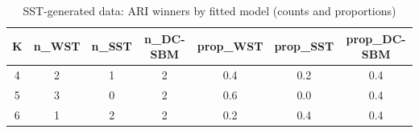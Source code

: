 \begin{table}[!h]
\centering
\caption{SST-generated data: ARI winners by fitted model (counts and proportions)\\\label{tab:sst-ari-winners}}
\centering
\begin{tabular}[t]{ccccccc}
\toprule
K & n_WST & n_SST & n_DC-SBM & prop_WST & prop_SST & prop_DC-SBM\\
\midrule
4 & 2 & 1 & 2 & 0.4 & 0.2 & 0.4\\
5 & 3 & 0 & 2 & 0.6 & 0.0 & 0.4\\
6 & 1 & 2 & 2 & 0.2 & 0.4 & 0.4\\
\bottomrule
\end{tabular}
\end{table}
